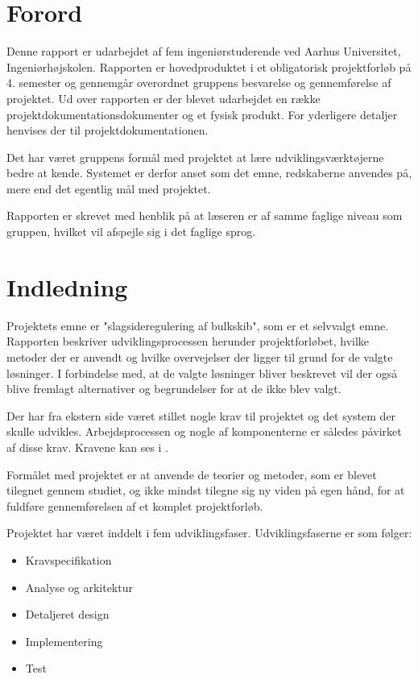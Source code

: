 \chapter{Forord}
\label{ch:forord}
Denne rapport er udarbejdet af fem ingeniørstuderende ved Aarhus Universitet, Ingeniørhøjskolen. Rapporten er hovedproduktet i et obligatorisk projektforløb på 4. semester og gennemgår overordnet gruppens besvarelse og gennemførelse af projektet. Ud over rapporten er der blevet udarbejdet en række projektdokumentationsdokumenter og et fysisk produkt. For yderligere detaljer henvises der til projektdokumentationen.

Det har været gruppens formål med projektet at lære udviklingsværktøjerne bedre at kende. Systemet er derfor anset som det emne, redskaberne anvendes på, mere end det egentlig mål med projektet.
 
Rapporten er skrevet med henblik på at læseren er af samme faglige niveau som gruppen, hvilket vil afspejle sig i det faglige sprog. 

\chapter{Indledning}
Projektets emne er "slagsideregulering af bulkskib", som er et selvvalgt emne. Rapporten beskriver udviklingsprocessen herunder projektforløbet, hvilke metoder der er anvendt og hvilke overvejelser der ligger til grund for de valgte løsninger. I forbindelse med, at de valgte løsninger bliver beskrevet vil der også blive fremlagt alternativer og begrundelser for at de ikke blev valgt. 

Der har fra ekstern side været stillet nogle krav til projektet og det system der skulle udvikles. Arbejdsprocessen og nogle af komponenterne er således påvirket af disse krav. Kravene kan ses i .

Formålet med projektet er at anvende de teorier og metoder, som er blevet tilegnet gennem studiet, og ikke mindst tilegne sig ny viden på egen hånd, for at fuldføre gennemførelsen af et komplet projektforløb.

Projektet har været inddelt i fem udviklingsfaser. Udviklingsfaserne er som følger:
\begin{itemize}
\item Kravspecifikation
\item Analyse og arkitektur
\item Detaljeret design
\item Implementering
\item Test
\end{itemize}


